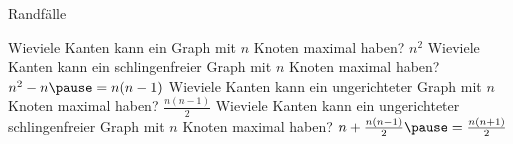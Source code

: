 \begin{frame}{Randfälle}
	\begin{itemize}
		\pitem Wieviele Kanten kann ein Graph mit $n$ Knoten maximal haben? \pause $n^2$
		\pitem Wieviele Kanten kann ein schlingenfreier Graph mit $n$ Knoten maximal haben? \pause $n^2-n \p = n(n-1)$
		\pitem Wieviele Kanten kann ein ungerichteter Graph mit $n$ Knoten maximal haben? \pause $\frac{n(n-1)}{2}$
		\pitem Wieviele Kanten kann ein ungerichteter schlingenfreier Graph mit $n$ Knoten maximal haben? \pause $n + \frac{n(n-1)}{2} \p = \frac{n(n+1)}{2}$
	\end{itemize}
\end{frame}

